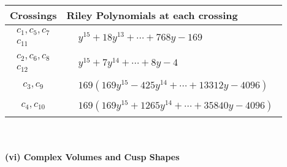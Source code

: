 \documentclass[1p]{elsarticle_modified}
\theoremstyle{definition}
\begin{document}
\begin{tabular}{m{50pt}|m{274pt}}
Crossings & \hspace{64pt}Riley Polynomials at each crossing \\
\hline $$\begin{aligned}c_{1},c_{5},c_{7}\\c_{11}\end{aligned}$$&$\begin{aligned}
&y^{15}+18 y^{13}+\cdots+768 y-169
\end{aligned}$\\
\hline $$\begin{aligned}c_{2},c_{6},c_{8}\\c_{12}\end{aligned}$$&$\begin{aligned}
&y^{15}+7 y^{14}+\cdots+8 y-4
\end{aligned}$\\
\hline $$\begin{aligned}c_{3},c_{9}\end{aligned}$$&$\begin{aligned}
&169(169 y^{15}-425 y^{14}+\cdots+13312 y-4096)
\end{aligned}$\\
\hline $$\begin{aligned}c_{4},c_{10}\end{aligned}$$&$\begin{aligned}
&169(169 y^{15}+1265 y^{14}+\cdots+35840 y-4096)
\end{aligned}$\\
\hline
\end{tabular}\\~\\
\newpage\flushleft \textbf{(vi) Complex Volumes and Cusp Shapes}
\end{document}
